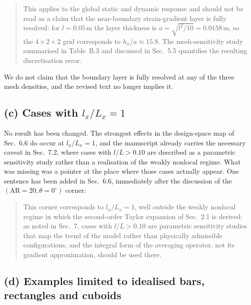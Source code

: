 \documentclass[12pt,a4paper]{article}
\begin{document}
\begin{quote}\small
This applies to the global static and dynamic response and
should not be read as a claim that the near-boundary strain-gradient
layer is fully resolved: for $l=0.05$\,m the layer thickness is
$a=\sqrt{l^{2}/10}=0.0158$\,m, so the $4\times2\times2$ grid corresponds
to $h_{x}/a\approx15.8$. The mesh-sensitivity study summarised in
Table~B.3 and discussed in
Sec.~5.5 quantifies the resulting
discretisation error.
\end{quote}

We do not claim that the boundary layer is fully resolved at any of the three mesh densities, and the revised text no longer implies it.

\subsection*{(c) Cases with $l_x/L_x = 1$}

No result has been changed. The strongest effects in the design-space map of Sec.~6.6 do occur at $l_x/L_x=1$, and the manuscript already carries the necessary caveat in Sec.~7.2, where cases with $l/L>0.10$ are described as a parametric sensitivity study rather than a realisation of the weakly nonlocal regime. What was missing was a pointer at the place where those cases actually appear. One sentence has been added in Sec.~6.6, immediately after the discussion of the $(\mathrm{AR}=20,\theta=0^\circ)$ corner:

\begin{quote}\small
This corner corresponds to $l_{x}/L_{x}=1$, well outside the
weakly nonlocal regime in which the second-order Taylor expansion of
Sec.~2.1 is derived; as noted in
Sec.~7, cases with $l/L>0.10$ are parametric
sensitivity studies that map the trend of the model rather than
physically admissible configurations, and the integral form of the
averaging operator, not its gradient approximation, should be used
there.
\end{quote}

\subsection*{(d) Examples limited to idealised bars, rectangles and cuboids}
\end{document}
